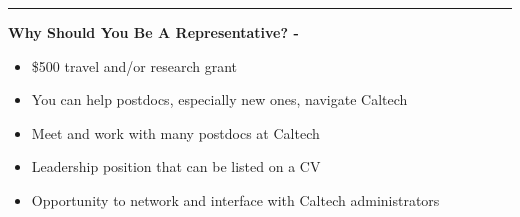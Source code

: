 \documentclass[12pt]{article}
\begin{document}
\rule{\textwidth}{0.5pt}

\textbf{Why Should You Be A Representative? -}
\begin{itemize}
 \item \$500 travel and/or research grant
 \item You can help postdocs, especially new ones, navigate Caltech
 \item Meet and work with many postdocs at Caltech
 \item Leadership position that can be listed on a CV 
 \item Opportunity to network and interface with Caltech administrators
\end{itemize}
\end{document}

